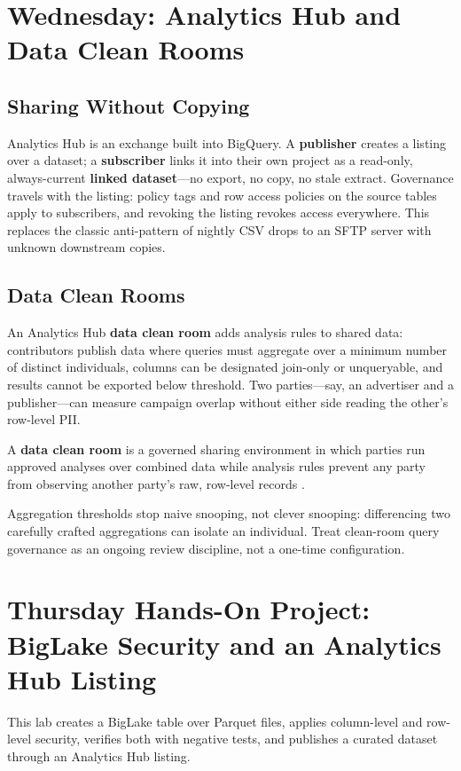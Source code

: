\section{Wednesday: Analytics Hub and Data Clean Rooms}

\subsection{Sharing Without Copying}
Analytics Hub is an exchange built into BigQuery. A \textbf{publisher} creates a listing over a dataset; a \textbf{subscriber} links it into their own project as a read-only, always-current \textbf{linked dataset}---no export, no copy, no stale extract. Governance travels with the listing: policy tags and row access policies on the source tables apply to subscribers, and revoking the listing revokes access everywhere. This replaces the classic anti-pattern of nightly CSV drops to an SFTP server with unknown downstream copies.

\subsection{Data Clean Rooms}
An Analytics Hub \textbf{data clean room} adds analysis rules to shared data: contributors publish data where queries must aggregate over a minimum number of distinct individuals, columns can be designated join-only or unqueryable, and results cannot be exported below threshold. Two parties---say, an advertiser and a publisher---can measure campaign overlap without either side reading the other's row-level PII.

\begin{definitionbox}
A \textbf{data clean room} is a governed sharing environment in which parties run approved analyses over combined data while analysis rules prevent any party from observing another party's raw, row-level records \cite{googlecloudanalyticshub}.
\end{definitionbox}

\begin{pitfall}
Aggregation thresholds stop naive snooping, not clever snooping: differencing two carefully crafted aggregations can isolate an individual. Treat clean-room query governance as an ongoing review discipline, not a one-time configuration.
\end{pitfall}

\section{Thursday Hands-On Project: BigLake Security and an Analytics Hub Listing}
This lab creates a BigLake table over Parquet files, applies column-level and row-level security, verifies both with negative tests, and publishes a curated dataset through an Analytics Hub listing.

